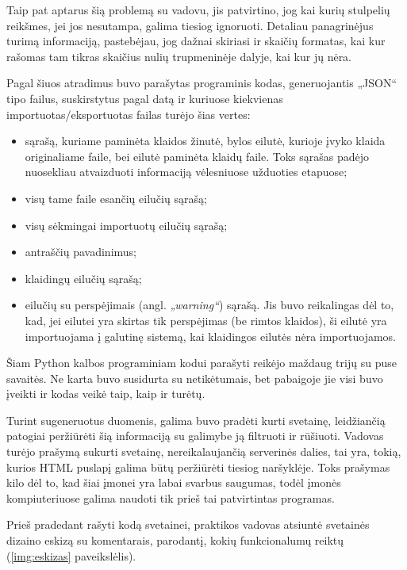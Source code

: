 \documentclass{VUMIFPSkursinis}
\begin{document}
Taip pat aptarus šią problemą su vadovu, jis patvirtino, jog kai kurių stulpelių reikšmes, jei jos nesutampa, galima tiesiog ignoruoti. Detaliau panagrinėjus turimą informaciją, pastebėjau, jog dažnai skiriasi ir skaičių formatas, kai kur rašomas tam tikras skaičius nulių trupmeninėje dalyje, kai kur jų nėra.

Pagal šiuos atradimus buvo parašytas programinis kodas, generuojantis „JSON“ tipo failus, suskirstytus pagal datą ir kuriuose kiekvienas importuotas/eksportuotas failas turėjo šias vertes:
\begin{itemize}
    \item sąrašą, kuriame paminėta klaidos žinutė, bylos eilutė, kurioje įvyko klaida originaliame faile, bei eilutė paminėta klaidų faile. Toks sąrašas padėjo nuosekliau atvaizduoti informaciją vėlesniuose užduoties etapuose;
    \item visų tame faile esančių eilučių sąrašą;
    \item visų sėkmingai importuotų eilučių sąrašą;
    \item antraščių pavadinimus;
    \item klaidingų eilučių sąrašą;
    \item eilučių su perspėjimais (angl. \emph{„warning“}) sąrašą. Jis buvo reikalingas dėl to, kad, jei eilutei yra skirtas tik perspėjimas (be rimtos klaidos), ši eilutė yra importuojama į galutinę sistemą, kai klaidingos eilutės nėra importuojamos. \newline
\end{itemize}

Šiam Python kalbos programiniam kodui parašyti reikėjo maždaug trijų su puse savaitės. Ne karta buvo susidurta su netikėtumais, bet pabaigoje jie visi buvo įveikti ir kodas veikė taip, kaip ir turėtų.


Turint sugeneruotus duomenis, galima buvo pradėti kurti svetainę, leidžiančią patogiai peržiūrėti šią informaciją su galimybe ją filtruoti ir rūšiuoti. Vadovas turėjo prašymą sukurti svetainę, nereikalaujančią serverinės dalies, tai yra, tokią, kurios HTML puslapį galima būtų peržiūrėti tiesiog naršyklėje. Toks prašymas kilo dėl to, kad šiai įmonei yra labai svarbus saugumas, todėl įmonės kompiuteriuose galima naudoti tik prieš tai patvirtintas programas. 

Prieš pradedant rašyti kodą svetainei, praktikos vadovas atsiuntė svetainės dizaino eskizą su komentarais, parodantį, kokių funkcionalumų reiktų (\ref{img:eskizas} paveikslėlis).
\end{document}
